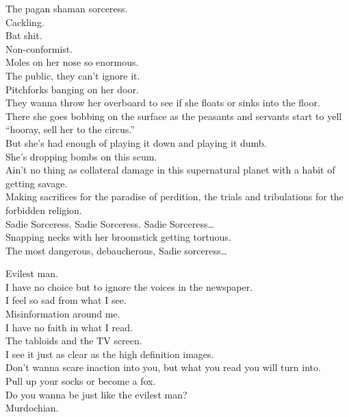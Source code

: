 The pagan shaman sorceress. \\
Cackling. \\
Bat shit. \\
Non-conformist. \\
Moles on her nose so enormous. \\
The public, they can't ignore it. \\
Pitchforks banging on her door. \\
They wanna throw her overboard to see if she floats or sinks into the floor. \\
There she goes bobbing on the surface as the peasants and servants start to yell ``hooray, sell her to the circus.'' \\
But she's had enough of playing it down and playing it dumb. \\
She's dropping bombs on this  scum. \\
Ain't no thing as collateral damage in this supernatural planet with a habit of getting savage. \\
Making sacrifices for the paradise of perdition, the trials and tribulations for the forbidden religion. \\

Sadie Sorceress. Sadie Sorceress. Sadie Sorceress… \\
Snapping necks with her broomstick getting tortuous. \\

The most dangerous, debaucherous, Sadie sorceress… \\




Evilest man. \\

I have no choice but to ignore the voices in the newspaper. \\
I feel so sad from what I see. \\
Misinformation around me. \\

I have no faith in what I read. \\
The tabloids and the TV screen. \\
I see it just as clear as the high definition images. \\

Don't wanna scare inaction into you, but what you read you will turn into. \\
Pull up your socks or become a fox. \\
Do you wanna be just like the evilest man? \\
Murdochian. \\


